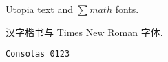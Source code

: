 \documentclass[nofonts]{ctexart}
\begin{document}
Utopia text and $\sum math$ fonts.

汉字楷书与 {\timesnew Times New Roman} 字体.

\texttt{Consolas 0123}
\end{document}
